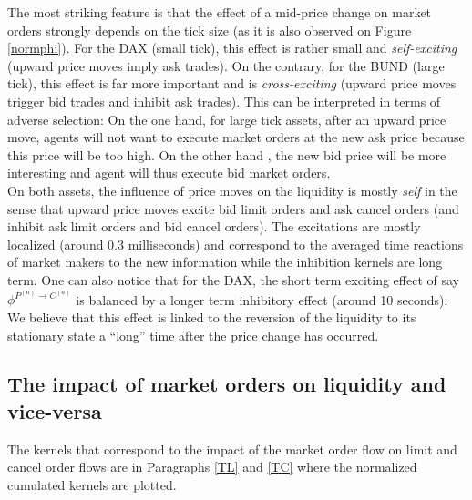\documentclass[a4paper,11pt]{article}
\newcommand{\PA}{P^{(a)}}
\newcommand{\CA}{C^{(a)}}
\begin{document}
\noindent The most striking feature is that the effect of a mid-price change on market orders strongly depends on the tick size (as it is also observed on Figure \ref{normphi}). For the DAX (small tick), this effect is rather small and {\em self-exciting} (upward price moves imply ask trades). On the contrary, for the BUND (large tick), this effect is far more important and is {\em cross-exciting} (upward price moves trigger bid trades and inhibit ask trades). This can be interpreted in terms of adverse selection: On the one hand, for large tick assets, after an upward price move, agents will not want to execute market orders at the new ask price because this price will be too high. On the other hand , the new bid price will be more interesting and agent will thus execute bid market orders.\\


\noindent On both assets, the influence of price moves on the liquidity is mostly {\em self} in the sense that upward price moves excite bid limit orders and ask cancel orders (and inhibit ask limit orders and bid cancel orders). The excitations are mostly localized (around 0.3 milliseconds) and correspond to the averaged time reactions of market makers to the new information while the inhibition kernels are long term. One can also notice that for the DAX, the short term exciting effect of say $\phi^{\PA\rightarrow \CA}$ is balanced by a longer term inhibitory effect (around 10 seconds). We believe that this effect is linked to the reversion of the liquidity to its stationary state a ``long'' time after the price change has occurred.

\subsection{The impact of market orders on liquidity and vice-versa}
The kernels that correspond to the impact of the market order flow on limit and cancel order flows are in Paragraphs \ref{TL} and \ref{TC} where the normalized cumulated kernels are plotted.\\
\end{document}
